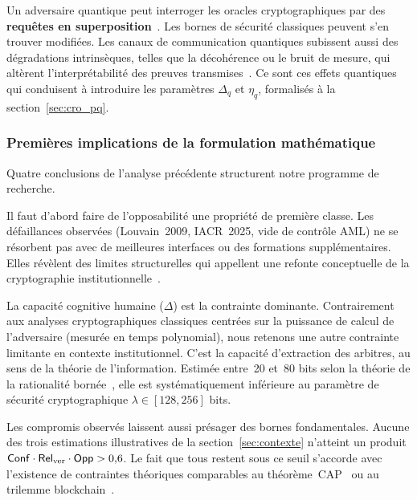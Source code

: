 \begin{sloppypar}
Un adversaire quantique peut interroger les oracles cryptographiques par des \textbf{requ\^etes en
superposition}~\cite{Boneh2011,Watrous2009,Zhandry}. Les bornes de s\'ecurit\'e
classiques peuvent s'en trouver modifi\'ees. Les canaux de
communication quantiques subissent aussi des d\'egradations intrins\`eques,
telles que la d\'ecoh\'erence ou le bruit de mesure, qui alt\`erent l'interpr\'etabilit\'e des
preuves transmises~\cite{Zurek2003,Wootters1982}. Ce sont ces effets quantiques~\cite{Mayers1997,Lo1997,Unruh2016} qui conduisent \`a introduire
les param\`etres $\Delta_q$ et $\eta_q$, formalis\'es \`a la section~\ref{sec:cro_pq}.

\subsubsection{Premi\`eres implications de la formulation math\'ematique}
\label{subsubsec:formulation_mathematique}

Quatre conclusions de l'analyse pr\'ec\'edente structurent notre programme
de recherche.

Il faut d'abord faire de l'opposabilit\'e une propri\'et\'e de premi\`ere classe. Les
d\'efaillances observ\'ees (Louvain~2009, IACR~2025, vide de contr\^ole
AML) ne se r\'esorbent pas avec de meilleures interfaces ou des
formations suppl\'ementaires. Elles r\'ev\`elent des limites structurelles
qui appellent une refonte conceptuelle de la cryptographie institutionnelle~\cite{Bonneau16,Narayanan16}.

La capacit\'e cognitive humaine ($\Delta$) est la contrainte dominante.
Contrairement aux analyses cryptographiques classiques centr\'ees sur la
puissance de calcul de l'adversaire (mesur\'ee en temps polynomial), nous
retenons une autre contrainte limitante en contexte institutionnel. C'est la capacit\'e
d'extraction des arbitres, au sens de la th\'eorie de l'information. Estim\'ee
entre~20 et~80 bits selon la th\'eorie de la rationalit\'e
born\'ee~\cite{Simon82,Simon1955,Miller56,Cowan2001,Ericsson95}, elle est syst\'ematiquement inf\'erieure au param\`etre de s\'ecurit\'e cryptographique $\lambda \in [128,256]$ bits.

Les compromis observ\'es laissent aussi pr\'esager des bornes fondamentales.
Aucune des trois estimations illustratives de la section~\ref{sec:contexte} n'atteint
un produit $\mathsf{Conf} \cdot \mathsf{Rel}_{\mathrm{ver}} \cdot \mathsf{Opp} > 0{,}6$.
Le fait que tous restent sous ce seuil s'accorde avec l'existence de contraintes th\'eoriques
comparables au th\'eor\`eme~CAP~\cite{Brewer00,GilbertLynch02} ou au trilemme
blockchain~\cite{Buterin17,Garay15}.


\end{sloppypar}
